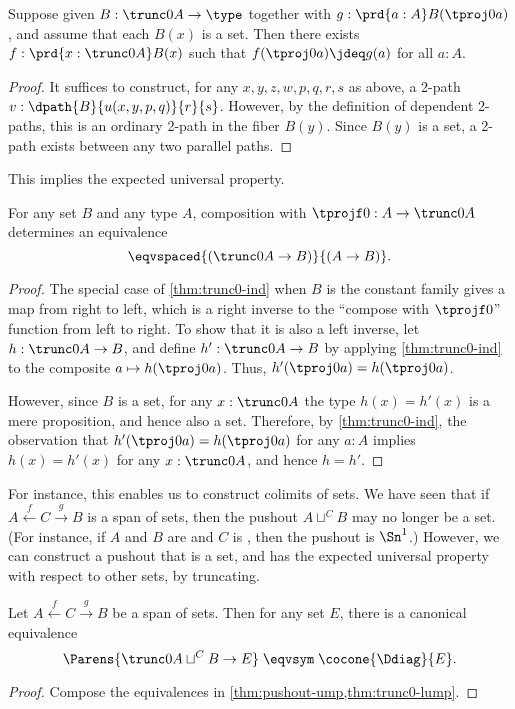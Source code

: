 \begin{lem}\label{thm:trunc0-ind}
  Suppose given $B:\trunc0 A \to \type$ together with $g:\prd{a:A} B(\tproj0a)$, and assume that each $B(x)$ is a set.
  Then there exists $f:\prd{x:\trunc0A} B(x)$ such that $f(\tproj0a)\jdeq g(a)$ for all $a:A$.
\end{lem}
\begin{proof}
  It suffices to construct, for any $x,y,z,w,p,q,r,s$ as above, a 2-path $v:\dpath{B}{u(x,y,p,q)}{r}{s}$.
  However, by the definition of dependent 2-paths, this is an ordinary 2-path in the fiber $B(y)$.
  Since $B(y)$ is a set, a 2-path exists between any two parallel paths.
\end{proof}

This implies the expected universal property.

\begin{lem}\label{thm:trunc0-lump}
  For any set $B$ and any type $A$, composition with $\tprojf0:A\to \trunc0A$ determines an equivalence
  \[ \eqvspaced{(\trunc0A\to B)}{(A\to B)}. \]
\end{lem}
\begin{proof}
  The special case of \cref{thm:trunc0-ind} when $B$ is the constant family gives a map from right to left, which is a right inverse to the ``compose with $\tprojf0$'' function from left to right.
  To show that it is also a left inverse, let $h:\trunc0A\to B$, and define $h':\trunc0A\to B$ by applying \cref{thm:trunc0-ind} to the composite $a\mapsto h(\tproj0a)$.
  Thus, $h'(\tproj0a)=h(\tproj0a)$.

  However, since $B$ is a set, for any $x:\trunc0A$ the type $h(x)=h'(x)$ is a mere proposition, and hence also a set.
  Therefore, by \cref{thm:trunc0-ind}, the observation that $h'(\tproj0a)=h(\tproj0a)$ for any $a:A$ implies $h(x)=h'(x)$ for any $x:\trunc0A$, and hence $h=h'$.
\end{proof}

%
%
For instance, this enables us to construct colimits of sets.
We have seen that if $A \xleftarrow{f} C \xrightarrow{g} B$ is a span of sets, then the pushout $A\sqcup^C B$ may no longer be a set.
(For instance, if $A$ and $B$ are \unit and $C$ is \bool, then the pushout is $\Sn^1$.)
However, we can construct a pushout that is a set, and has the expected universal property with respect to other sets, by truncating.

\begin{lem}\label{thm:set-pushout}
  Let $A \xleftarrow{f} C \xrightarrow{g} B$ be a span of sets.
  Then for any set $E$, there is a canonical equivalence
  \[ \Parens{\trunc0{A\sqcup^C B} \to E} \;\eqvsym\; \cocone{\Ddiag}{E}. \]
\end{lem}
\begin{proof}
  Compose the equivalences in \cref{thm:pushout-ump,thm:trunc0-lump}.
\end{proof}


